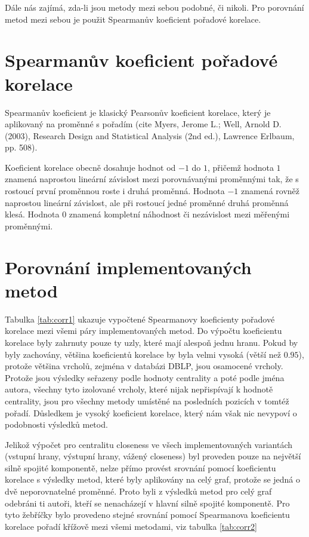 \documentclass{bakalarka}
\begin{document}
Dále nás zajímá, zda-li jsou metody mezi sebou podobné, či nikoli. Pro
porovnání metod mezi sebou je použit Spearmanův koeficient pořadové korelace.

\section{Spearmanův koeficient pořadové korelace}
Spearmanův koeficient je klasický Pearsonův koeficient korelace, který je
aplikovaný na proměnné s pořadím (cite Myers, Jerome L.; Well, Arnold D.
(2003), Research Design and Statistical Analysis (2nd ed.), Lawrence Erlbaum,
pp. 508).

Koeficient korelace obecně dosahuje hodnot od $-1$ do $1$, přičemž hodnota $1$
znamená naprostou lineární závislost mezi porovnávanými proměnnými tak, že s
rostoucí první proměnnou roste i druhá proměnná. Hodnota $-1$ znamená rovněž
naprostou lineární závislost, ale při rostoucí jedné proměnné druhá proměnná
klesá. Hodnota $0$ znamená kompletní náhodnost či nezávislost mezi měřenými
proměnnými.


\section{Porovnání implementovaných metod}
Tabulka \ref{tab:corr1} ukazuje vypočtené Spearmanovy koeficienty pořadové
korelace mezi všemi páry implementovaných metod. Do výpočtu koeficientu
korelace byly zahrnuty pouze ty uzly, které mají alespoň jednu hranu. Pokud by
byly zachovány, většina koeficientů korelace by byla velmi vysoká (větší než
$0.95$), protože většina vrcholů, zejména v databázi DBLP, jsou osamocené
vrcholy. Protože jsou výsledky seřazeny podle hodnoty centrality a poté podle
jména autora, všechny tyto izolované vrcholy, které nijak nepřispívají k
hodnotě centrality, jsou pro všechny metody umístěné na posledních pozicích v
tomtéž pořadí. Důsledkem je vysoký koeficient korelace, který nám však nic
nevypoví o podobnosti výsledků metod.

Jelikož výpočet pro centralitu closeness ve všech implementovaných variantách
(vstupní hrany, výstupní hrany, vážený closeness) byl proveden pouze na
největší silně spojité komponentě, nelze přímo provést srovnání pomocí
koeficientu korelace s výsledky metod, které byly aplikovány na celý graf,
protože se jedná o dvě neporovnatelné proměnné. Proto byli z výsledků metod pro
celý graf odebráni ti autoři, kteří se nenacházejí v hlavní silně spojité
komponentě. Pro tyto žebříčky bylo provedeno stejné srovnání pomocí Spearmanova
koeficientu korelace pořadí křížově mezi všemi metodami, viz tabulka
\ref{tab:corr2}
\end{document}
